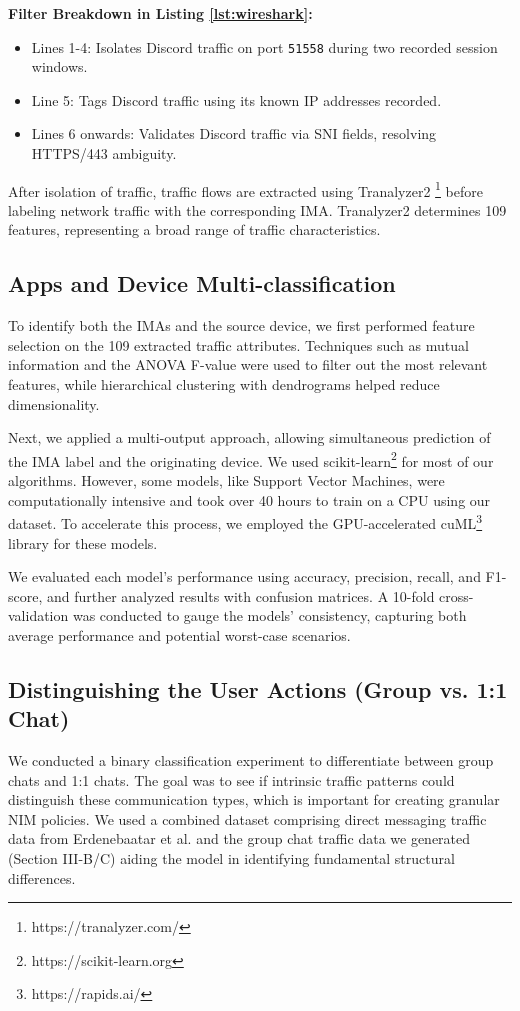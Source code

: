 \documentclass[conference]{IEEEtran}
\begin{document}
\textbf{Filter Breakdown in Listing \ref{lst:wireshark}:}
\begin{itemize}
    \item Lines 1-4: Isolates Discord traffic on port \texttt{51558} during two recorded session windows.
    \item Line 5: Tags Discord traffic using its known IP addresses recorded.
    \item Lines 6 onwards: Validates Discord traffic via SNI fields, resolving HTTPS/443 ambiguity.
\end{itemize}

After isolation of traffic, traffic flows are extracted using Tranalyzer2 \footnote{https://tranalyzer.com/} before labeling network traffic with the corresponding IMA. Tranalyzer2 determines 109 features, representing a broad range of traffic characteristics.

\subsection{Apps and Device Multi-classification}
To identify both the IMAs and the source device, we first performed feature selection on the 109 extracted traffic attributes. Techniques such as mutual information and the ANOVA F-value were used to filter out the most relevant features, while hierarchical clustering with dendrograms helped reduce dimensionality.

Next, we applied a multi-output approach, allowing simultaneous prediction of the IMA label and the originating device. We used scikit-learn\footnote{https://scikit-learn.org} for most of our algorithms. However, some models, like Support Vector Machines, were computationally intensive and took over 40 hours to train on a CPU using our dataset. To accelerate this process, we employed the GPU-accelerated cuML\footnote{https://rapids.ai/} library for these models.

We evaluated each model's performance using accuracy, precision, recall, and F1-score, and further analyzed results with confusion matrices. A 10-fold cross-validation was conducted to gauge the models' consistency, capturing both average performance and potential worst-case scenarios.

\subsection{Distinguishing the User Actions (Group vs. 1:1 Chat)}
We conducted a binary classification experiment to differentiate between group chats and 1:1 chats. The goal was to see if intrinsic traffic patterns could distinguish these communication types, which is important for creating granular NIM policies. We used a combined dataset comprising direct messaging traffic data from Erdenebaatar et al.\cite{b1} and the group chat traffic data we generated (Section III-B/C) aiding the model in identifying fundamental structural differences.
\end{document}

